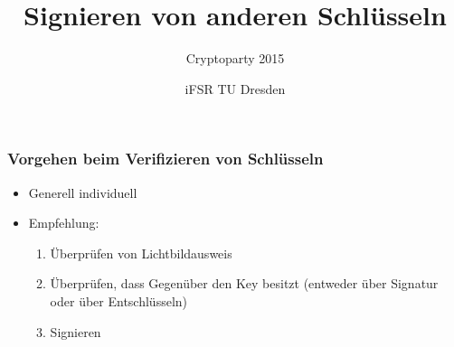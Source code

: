 \documentclass{beamer}
\title{Signieren von anderen Schlüsseln}
\subtitle{Cryptoparty 2015}
\author{iFSR TU Dresden}
\begin{document}
\begin{frame}
  \maketitle
\end{frame}

\begin{frame}
  \frametitle{Vorgehen beim Verifizieren von Schlüsseln}
  \begin{itemize}
  \item Generell individuell
  \item Empfehlung:
    \begin{enumerate}
    \item Überprüfen von Lichtbildausweis
    \item Überprüfen, dass Gegenüber den Key besitzt (entweder über Signatur
      oder über Entschlüsseln)
    \item Signieren
    \end{enumerate}
  \end{itemize}
\end{frame}
\end{document}
